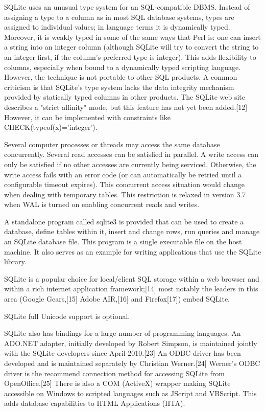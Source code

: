 \vpara
SQLite uses an unusual type system for an SQL-compatible DBMS. Instead of assigning a type to a column as in most SQL database systems, types are assigned to individual values; in language terms it is dynamically typed. Moreover, it is weakly typed in some of the same ways that Perl is: one can insert a string into an integer column (although SQLite will try to convert the string to an integer first, if the column's preferred type is integer). This adds flexibility to columns, especially when bound to a dynamically typed scripting language. However, the technique is not portable to other SQL products. A common criticism is that SQLite's type system lacks the data integrity mechanism provided by statically typed columns in other products. The SQLite web site describes a "strict affinity" mode, but this feature has not yet been added.[12] However, it can be implemented with constraints like CHECK(typeof(x)='integer').

\vpara
Several computer processes or threads may access the same database concurrently. Several read accesses can be satisfied in parallel. A write access can only be satisfied if no other accesses are currently being serviced. Otherwise, the write access fails with an error code (or can automatically be retried until a configurable timeout expires). This concurrent access situation would change when dealing with temporary tables. This restriction is relaxed in version 3.7 when WAL is turned on enabling concurrent reads and writes.

\vpara
A standalone program called sqlite3 is provided that can be used to create a database, define tables within it, insert and change rows, run queries and manage an SQLite database file. This program is a single executable file on the host machine. It also serves as an example for writing applications that use the SQLite library.

\vpara
SQLite is a popular choice for local/client SQL storage within a web browser and within a rich internet application framework;[14] most notably the leaders in this area (Google Gears,[15] Adobe AIR,[16] and Firefox[17]) embed SQLite.

\vpara
SQLite full Unicode support is optional.

\vpara
SQLite also has bindings for a large number of programming languages. An ADO.NET adapter, initially developed by Robert Simpson, is maintained jointly with the SQLite developers since April 2010.[23] An ODBC driver has been developed and is maintained separately by Christian Werner.[24] Werner's ODBC driver is the recommend connection method for accessing SQLite from OpenOffice.[25] There is also a COM (ActiveX) wrapper making SQLite accessible on Windows to scripted languages such as JScript and VBScript. This adds database capabilities to HTML Applications (HTA).

